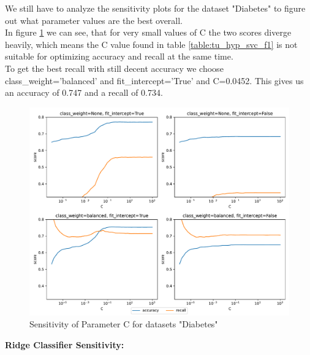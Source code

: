 \documentclass[a4paper,10pt]{article}
\begin{document}
We still have to analyze the sensitivity plots for the dataset "Diabetes" to figure out what parameter values are the best overall.\\
In figure \ref{fig:sensitivity svc diabetes} we can see, that for very small values of \textsf{C} the two scores diverge heavily, which means the \textsf{C} value found in table \ref{table:tu_hyp_svc_f1} is not suitable for optimizing accuracy and recall at the same time.\\
To get the best recall with still decent accuracy we choose \textsf{class\_weight}=\textsf{'balanced'} and \textsf{fit\_intercept}='True' and \textsf{C}=0.0452. This gives us an accuracy of 0.747 and a recall of 0.734.%

\begin{figure}[h!]
    \centering
    \includegraphics[width=\textwidth]{diabetes/plots/linearsvc_parameter_sensitivity.pdf}
    \caption{Sensitivity of Parameter \textsf{C} for datasets "Diabetes"}
    \label{fig:sensitivity svc diabetes}
\end{figure}

\textbf{Ridge Classifier Sensitivity:}
\end{document}
